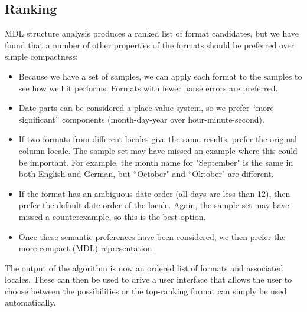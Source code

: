 \subsection{Ranking}
MDL structure analysis produces a ranked list of format candidates, but we have found that a number of other properties of the formats should be preferred over simple compactness:
\begin{itemize}
\setlength\itemsep{0em}
\item Because we have a set of samples, we can apply each format to the samples to see how well it performs. Formats with fewer parse errors are preferred.
\item Date parts can be considered a place-value system, so we prefer ``more significant'' components (\eg month-day-year over hour-minute-second).
\item If two formats from different locales give the same results, prefer the original column locale. The sample set may have missed an example where this could be important. For example, the month name for "September" is the same in both English and German, but ``October" and ``Oktober" are different.
\item If the format has an ambiguous date order (\eg all days are less than 12), then prefer the default date order of the locale. Again, the sample set may have missed a counterexample, so this is the best option.
\item Once these semantic preferences have been considered, we then prefer the more compact (MDL) representation.
\end{itemize}

The output of the algorithm is now an ordered list of formats and associated locales. These can then be used to drive a user interface that allows the user to choose between the possibilities or the top-ranking format can simply be used automatically.

